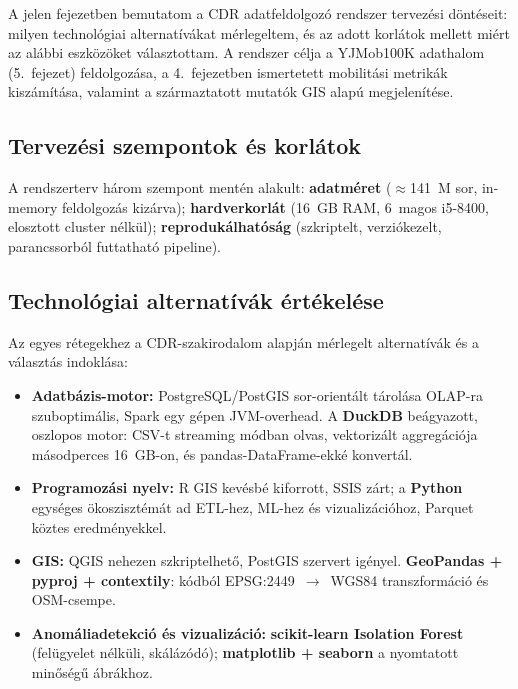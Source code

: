 
A jelen fejezetben bemutatom a CDR adatfeldolgozó rendszer tervezési döntéseit: milyen technológiai alternatívákat mérlegeltem, és az adott korlátok mellett miért az alábbi eszközöket választottam. A rendszer célja a YJMob100K adathalom (5.\ fejezet) feldolgozása, a 4.\ fejezetben ismertetett mobilitási metrikák kiszámítása, valamint a származtatott mutatók GIS alapú megjelenítése.

\subsection{Tervezési szempontok és korlátok}

A rendszerterv három szempont mentén alakult: \textbf{adatméret} ($\approx$141~M sor, in-memory feldolgozás kizárva); \textbf{hardverkorlát} (16~GB RAM, 6~magos i5-8400, elosztott cluster nélkül); \textbf{reprodukálhatóság} (szkriptelt, verziókezelt, parancssorból futtatható pipeline).

\subsection{Technológiai alternatívák értékelése}

Az egyes rétegekhez a CDR-szakirodalom \cite{zhang2019connected, pinter2020artificial} alapján mérlegelt alternatívák és a választás indoklása:

\begin{itemize}
    \item \textbf{Adatbázis-motor:} PostgreSQL/PostGIS sor-orientált tárolása OLAP-ra szuboptimális, Spark egy gépen JVM-overhead. A \textbf{DuckDB} beágyazott, oszlopos motor: CSV-t streaming módban olvas, vektorizált aggregációja másodperces 16~GB-on, és pandas-DataFrame-ekké konvertál.
    \item \textbf{Programozási nyelv:} R GIS kevésbé kiforrott, SSIS zárt; a \textbf{Python} egységes ökoszisztémát ad ETL-hez, ML-hez és vizualizációhoz, Parquet köztes eredményekkel.
    \item \textbf{GIS:} QGIS nehezen szkriptelhető, PostGIS szervert igényel. \textbf{GeoPandas + pyproj + contextily}: kódból EPSG:2449~$\rightarrow$~WGS84 transzformáció és OSM-csempe.
    \item \textbf{Anomáliadetekció és vizualizáció:} \textbf{scikit-learn Isolation Forest} (felügyelet nélküli, skálázódó); \textbf{matplotlib + seaborn} a nyomtatott minőségű ábrákhoz.
\end{itemize}

